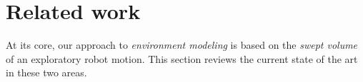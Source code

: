 \section{Related work}
\label{sec:background}
\noindent At its core, 
our approach to \emph{environment modeling} is based on the \emph{swept volume} of an exploratory robot motion. 
This section reviews the current state of the art in these two areas.

